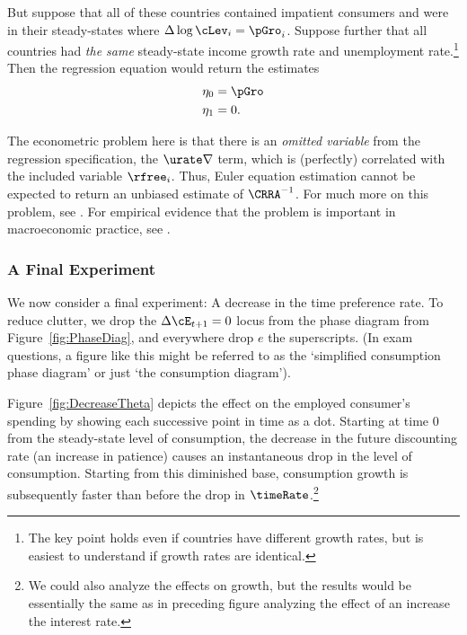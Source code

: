 \documentclass{handout}
\begin{document}
But suppose that all of these countries contained impatient consumers
and were in their steady-states where $\Delta \log \cLev_{i} = \pGro_{i}$.
Suppose further
that all countries had {\it the same} steady-state income growth rate and
unemployment rate.\footnote{The key point holds even if countries have different
growth rates, but is easiest to understand if growth rates are identical.}
Then the regression equation would return the estimates
\begin{equation}\begin{gathered}\begin{aligned}
        \eta_{0} & =  \pGro  \\
        \eta_{1} & =  0.
\end{aligned}\end{gathered}\end{equation}

The econometric problem here is that there is an {\it omitted
variable} from the regression specification, the $\urate \nabla$ term, which is (perfectly) correlated with the included
variable $\rfree_{i}$.  Thus, Euler equation estimation cannot be expected to
return an unbiased estimate of $\CRRA^{-1}$.  For much more on this
problem, see \cite{carroll:death}.  For empirical evidence
that the problem is important in macroeconomic practice, see \cite{ParkerPrestonPrecaution}.

\subsubsection{A Final Experiment}
We now consider a final experiment: A decrease in the time preference
rate.  To reduce clutter, we drop the $\Delta \cE_{t+1}=0$ locus from the 
phase diagram from Figure~\ref{fig:PhaseDiag}, and everywhere drop $e$ the superscripts.  
(In exam questions, a figure like this might be referred to as the `simplified consumption phase diagram' or just
`the consumption diagram').

Figure~\ref{fig:DecreaseTheta} depicts the effect on the 
employed consumer's spending by
showing each successive point in time as a dot.  
Starting at time 0 from the steady-state level of consumption, the
decrease in the future discounting rate (an increase in patience) causes
an instantaneous drop in the level of consumption.  Starting from this diminished 
base, consumption growth is subsequently faster than before the drop in $\timeRate$.\footnote{We could also analyze the effects on growth, but the
  results would be essentially the same as in preceding figure
  analyzing the effect of an increase the interest rate.}
\end{document}
